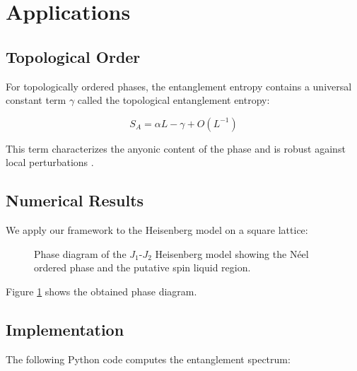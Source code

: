 \documentclass[papermode]{academic-report}
\begin{document}
\section{Applications}

\subsection{Topological Order}

For topologically ordered phases, the entanglement entropy contains a universal
constant term $\gamma$ called the topological entanglement entropy:

\begin{equation}
  S_A = \alpha L - \gamma + O(L^{-1})
\end{equation}

This term characterizes the anyonic content of the phase and is robust against
local perturbations \cite{kitaev2006}.

\subsection{Numerical Results}

We apply our framework to the Heisenberg model on a square lattice:

\begin{figure}[htbp]
  \centering
  \caption{Phase diagram of the $J_1$-$J_2$ Heisenberg model showing the
           N\'eel ordered phase and the putative spin liquid region.}
  \label{fig:phasediagram}
\end{figure}

Figure \ref{fig:phasediagram} shows the obtained phase diagram.

\subsection{Implementation}

The following Python code computes the entanglement spectrum:
\end{document}
